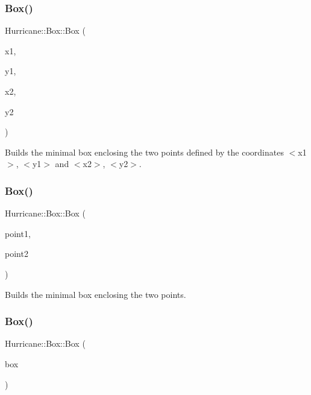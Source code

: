 \subsubsection{\texorpdfstring{Box()}{Box()}\hspace{0.1cm}{\footnotesize\ttfamily [4/6]}}
{\footnotesize\ttfamily Hurricane\+::\+Box\+::\+Box (\begin{DoxyParamCaption}\item[{const \mbox{\hyperlink{group__DbUGroup_ga4fbfa3e8c89347af76c9628ea06c4146}{Db\+U\+::\+Unit}} \&}]{x1,  }\item[{const \mbox{\hyperlink{group__DbUGroup_ga4fbfa3e8c89347af76c9628ea06c4146}{Db\+U\+::\+Unit}} \&}]{y1,  }\item[{const \mbox{\hyperlink{group__DbUGroup_ga4fbfa3e8c89347af76c9628ea06c4146}{Db\+U\+::\+Unit}} \&}]{x2,  }\item[{const \mbox{\hyperlink{group__DbUGroup_ga4fbfa3e8c89347af76c9628ea06c4146}{Db\+U\+::\+Unit}} \&}]{y2 }\end{DoxyParamCaption})}

Builds the minimal box enclosing the two points defined by the coordinates {\ttfamily $<$x1$>$}, {\ttfamily $<$y1$>$} and {\ttfamily $<$x2$>$}, {\ttfamily $<$y2$>$}. \mbox{\label{classHurricane_1_1Box_a47f434b4dbda6af14a354722f66a47da}} 
\subsubsection{\texorpdfstring{Box()}{Box()}\hspace{0.1cm}{\footnotesize\ttfamily [5/6]}}
{\footnotesize\ttfamily Hurricane\+::\+Box\+::\+Box (\begin{DoxyParamCaption}\item[{const \mbox{\hyperlink{classHurricane_1_1Point}{Point}} \&}]{point1,  }\item[{const \mbox{\hyperlink{classHurricane_1_1Point}{Point}} \&}]{point2 }\end{DoxyParamCaption})}

Builds the minimal box enclosing the two points. \mbox{\label{classHurricane_1_1Box_af9a7605270bf1ebb38723fba5b9d9236}} 
\subsubsection{\texorpdfstring{Box()}{Box()}\hspace{0.1cm}{\footnotesize\ttfamily [6/6]}}
{\footnotesize\ttfamily Hurricane\+::\+Box\+::\+Box (\begin{DoxyParamCaption}\item[{const \mbox{\hyperlink{classHurricane_1_1Box}{Box}} \&}]{box }\end{DoxyParamCaption})}

